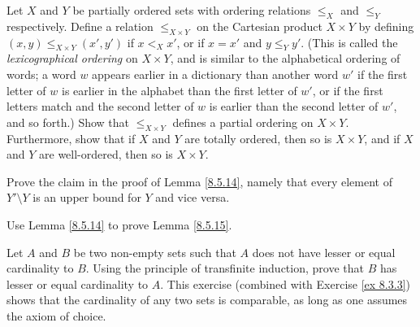 \begin{exercise}\label{ex 8.5.12}
    Let \(X\) and \(Y\) be partially ordered sets with ordering relations \(\leq_X\) and \(\leq_Y\) respectively.
    Define a relation \(\leq_{X \times Y}\) on the Cartesian product \(X \times Y\) by defining \((x, y) \leq_{X \times Y} (x', y')\) if \(x <_X x'\), or if \(x = x'\) and \(y \leq_Y y'\).
    (This is called the \emph{lexicographical ordering} on \(X \times Y\), and is similar to the alphabetical ordering of words;
    a word \(w\) appears earlier in a dictionary than another word \(w'\) if the first letter of \(w\) is earlier in the alphabet than the first letter of \(w'\), or if the first letters match and the second letter of \(w\) is earlier than the second letter of \(w'\), and so forth.)
    Show that \(\leq_{X \times Y}\) defines a partial ordering on \(X \times Y\).
    Furthermore, show that if \(X\) and \(Y\) are totally ordered, then so is \(X \times Y\), and if \(X\) and \(Y\) are well-ordered, then so is \(X \times Y\).
\end{exercise}

\begin{exercise}\label{ex 8.5.13}
    Prove the claim in the proof of Lemma \ref{8.5.14}, namely that every element of \(Y' \setminus Y\) is an upper bound for \(Y\) and vice versa.
\end{exercise}

\begin{exercise}\label{ex 8.5.14}
    Use Lemma \ref{8.5.14} to prove Lemma \ref{8.5.15}.
\end{exercise}

\begin{exercise}\label{ex 8.5.15}
    Let \(A\) and \(B\) be two non-empty sets such that \(A\) does not have lesser or equal cardinality to \(B\).
    Using the principle of transfinite induction, prove that \(B\) has lesser or equal cardinality to \(A\).
    This exercise (combined with Exercise \ref{ex 8.3.3}) shows that the cardinality of any two sets is comparable, as long as one assumes the axiom of choice.
\end{exercise}

